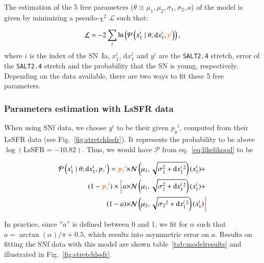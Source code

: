 \documentclass[]{aa} %
\newcommand{\mr}[1]{{\textcolor[rgb]{0.60,0.10,0.6}{#1}}}
\newcommand{\nn}[1]{{\textcolor[rgb]{1, 0.27, 0}{#1}}}
\newcommand{\prob}[2]{\mathcal{P}\left( #1 \mid #2\right)}
\begin{document}
The estimation of the 5 free parameters
($\theta\equiv{\mu_1,\mu_2,\sigma_1,\sigma_2,a}$) of the model is given by
minimizing a pseudo-$\chi^2$ $\mathcal{L}$ such that:

\begin{equation}
    \label{eq:likelihood}
    \mathcal{L} = -2 \sum_i \ln\left( \prob{x^{i}_{1}}{ \theta;
    \mathrm{d}x^{i}_{1}, \nn{y^i}}\right),
\end{equation}
\nn{where $i$ is the index of the SN~Ia, $x^{i}_{1}$, $\mathrm{d}x^{i}_{1}$ and
    $y^i$ are the \textsc{\texttt{SALT2.4}} stretch, error of the
    \textsc{\texttt{SALT2.4}} stretch and the probability that the SN is young,
    respectively. Depending on the data available, there are two ways to fit
these 5 free parameters}.

\subsubsection{\nn{Parameters estimation with LsSFR data}}
\label{sec:modelpy}

\nn{When using SNf data, we choose $y^i$ to be their given $p_y{}^i$, computed
from their LsSFR data (see Fig.~\ref{fig:stretchlssfr}). \nn{It represents the
probability to be above $\log(\mathrm{LsSFR} = -10.82)$.} Thus, we would have
$\mathcal{P}$ from eq.~\ref{eq:likelihood} to be}

\begin{align}
    \label{eq:likelihoodsnf}
    \prob{x^{i}_{1}}{\theta; \mathrm{d}x^{i}_{1}, p\nn{_y{}^i}} =
    \nn{p_y{}^i} \times &\mathcal{N}\left(\mu_1,
    \sqrt{\sigma_{1}^{2}+\mathrm{d}x^{i}_{1}{}^{2}}\right)(x^{i}_{1}) +
    \nonumber\\
        (1-\nn{p_y{}^i}) \times \nn{\bigg[} a \times &
        \mathcal{N}\left(\mu_1,
        \sqrt{\sigma_{1}^{2}+\mathrm{d}x^{i}_{1}{}^{2}}\right)(x^{i}_{1}) +
        \nonumber\\
     (1-a) \times &\mathcal{N}\left(\mu_2,
 \sqrt{\sigma_2{}^{2}+\mathrm{d}x^{i}_{1}{}^{2}}\right)(x^{i}_{1}) \nn{\bigg]}
\end{align}

In practice, since ''$a$'' is defined between 0 and 1, we fit for $\alpha$ such
that $a=\arctan(\alpha)/\pi+0.5$, which results into asymmetric error on $a$.
\mr{Results on fitting the SNf data with this model are shown
table~\ref{tab:modelresults} and illustrated in Fig.~\ref{fig:stretchlssfr}.}
\end{document}
